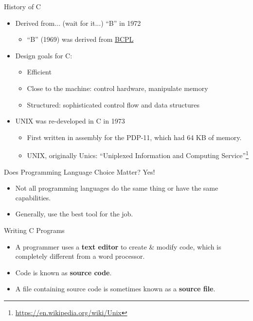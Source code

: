 \documentclass[graphics]{beamer}
\begin{document}
\begin{frame}{History of C}
    \begin{itemize}
        \item Derived from... (wait for it...) ``B'' in 1972
        \begin{itemize}
            \item ``B'' (1969) was derived from \href{https://en.wikipedia.org/wiki/BCPL}{BCPL}
        \end{itemize}
        \item Design goals for C:
        \begin{itemize}
            \item Efficient
            \item Close to the machine: control hardware, manipulate memory
            \item Structured: sophisticated control flow and data structures
        \end{itemize}
        \item UNIX was re-developed in C in 1973
        \begin{itemize}
            \item First written in assembly for the PDP-11, which had 64 KB of memory.
            \item UNIX, originally Unics: ``Uniplexed Information and Computing Service''\footnote{\url{https://en.wikipedia.org/wiki/Unix}}
        \end{itemize}
    \end{itemize}
\end{frame}

\begin{frame}{Does Programming Language Choice Matter?}
    Yes!
    \begin{itemize}
        \item Not all programming languages do the same thing or have the same capabilities.
        \item Generally, use the best tool for the job.
    \end{itemize}
\end{frame}

\begin{frame}{Writing C Programs}
    \begin{itemize}
        \item A programmer uses a \textbf{text editor} to create \& modify code, which is completely different from a word processor.
        \item Code is known as \textbf{source code}.
        \item A file containing source code is sometimes known as a \textbf{source file}.
    \end{itemize}
\end{frame}
\end{document}
